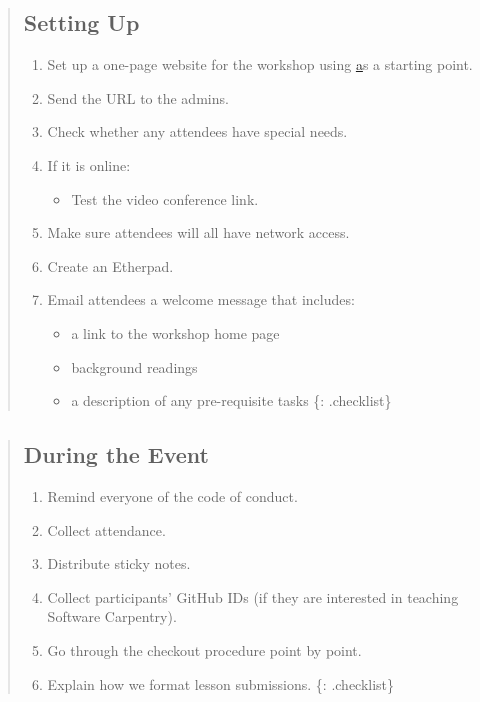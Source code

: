 \begin{quote}
\subsection{Setting Up}\label{setting-up}

\begin{enumerate}
\item
  Set up a one-page website for the workshop using
  \href{https://github.com/swcarpentry/training-template} as a starting
  point.
\item
  Send the URL to the admins.
\item
  Check whether any attendees have special needs.
\item
  If it is online:

  \begin{itemize}
    \item
    Test the video conference link.
  \end{itemize}
\item
  Make sure attendees will all have network access.
\item
  Create an Etherpad.
\item
  Email attendees a welcome message that includes:

  \begin{itemize}
    \item
    a link to the workshop home page
  \item
    background readings
  \item
    a description of any pre-requisite tasks \{: .checklist\}
  \end{itemize}
\end{enumerate}
\end{quote}

\begin{quote}
\subsection{During the Event}\label{during-the-event}

\begin{enumerate}
\item
  Remind everyone of the code of conduct.
\item
  Collect attendance.
\item
  Distribute sticky notes.
\item
  Collect participants' GitHub IDs (if they are interested in teaching
  Software Carpentry).
\item
  Go through
  the checkout procedure point by point.
\item
  Explain how we
  format lesson submissions. \{: .checklist\}
\end{enumerate}
\end{quote}

